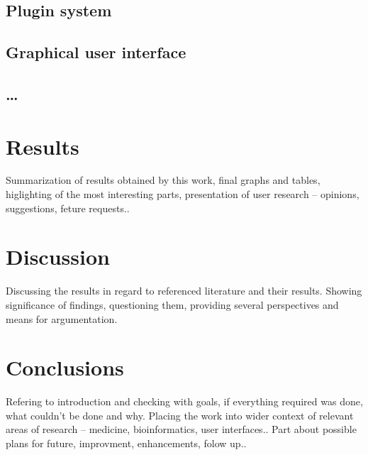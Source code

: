 \section{Plugin system}
\section{Graphical user interface}
\section{\ldots}
\chapter{Results}
Summarization of results obtained by this work, final graphs and tables,
higlighting of the most interesting parts, presentation of user 
research -- opinions, suggestions,
feture requests..
\chapter{Discussion}
Discussing the results in regard to referenced literature and their results.
Showing significance of findings, questioning them, providing several
perspectives and means for argumentation.
\chapter{Conclusions}
Refering to introduction and checking with goals, if everything required was
done, what couldn't be done and why. Placing the work into wider context of
relevant areas of research -- medicine, bioinformatics, user interfaces..
Part about possible plans for future, improvment, enhancements, folow
up..
